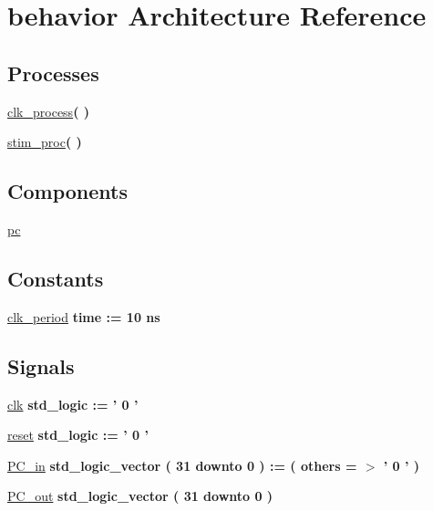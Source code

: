 \hypertarget{class_p_counte__tb_1_1behavior}{\section{behavior \-Architecture \-Reference}
\label{class_p_counte__tb_1_1behavior}
}
\*
\*
\subsection*{\-Processes}
 \begin{DoxyCompactItemize}
\item 
\hyperlink{class_p_counte__tb_1_1behavior_ac5bb218131b813f7908ec89476b31fca}{clk\-\_\-process}{\bfseries  (  )}
\item 
\hyperlink{class_p_counte__tb_1_1behavior_ad2efa6785cff833c341e27596b21aeb5}{stim\-\_\-proc}{\bfseries  (  )}
\end{DoxyCompactItemize}
\subsection*{\-Components}
 \begin{DoxyCompactItemize}
\item 
\hyperlink{class_p_counte__tb_1_1behavior_aaf5ddd6f1a6925eba963bfefa161e9df}{pc}  {\bfseries }  
\end{DoxyCompactItemize}
\subsection*{\-Constants}
 \begin{DoxyCompactItemize}
\item 
\hyperlink{class_p_counte__tb_1_1behavior_a84fbaa8d4f8539ee8577e4f05d006dfb}{clk\-\_\-period} {\bfseries time  \-:=  10  ns } 
\end{DoxyCompactItemize}
\subsection*{\-Signals}
 \begin{DoxyCompactItemize}
\item 
\hyperlink{class_p_counte__tb_1_1behavior_acb38257efabc3b2fa08d2a365cd7ff01}{clk} {\bfseries std\-\_\-logic  \-:= '  0  ' } 
\item 
\hyperlink{class_p_counte__tb_1_1behavior_afedcb12b726c79840717ef89dbe704ed}{reset} {\bfseries std\-\_\-logic  \-:= '  0  ' } 
\item 
\hyperlink{class_p_counte__tb_1_1behavior_ac2dd31bad98644f37a6e62a770f5a5f7}{\-P\-C\-\_\-in} {\bfseries std\-\_\-logic\-\_\-vector (   31    downto    0  )  \-:= (  others  = $>$ '  0  '  ) } 
\item 
\hyperlink{class_p_counte__tb_1_1behavior_a43d3d66618c7e36ea6b882156984c629}{\-P\-C\-\_\-out} {\bfseries std\-\_\-logic\-\_\-vector (   31    downto    0  ) } 
\end{DoxyCompactItemize}


